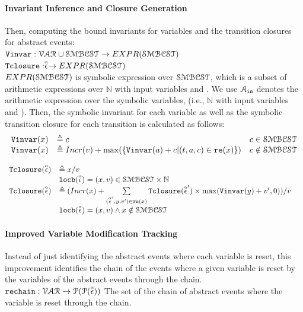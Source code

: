 \paragraph*{Invariant Inference and Closure Generation }
Then, computing the bound invariants for variables and the transition closures for abstract events:
\\ 
$ {\mathtt{Vinvar}}: \mathcal{VAR} \cup \mathcal{SMBCST} \to EXPR(\mathcal{SMBCST})$
\\
${\mathtt{Tclosure}}: \stackrel{\scriptscriptstyle{\alpha}}{\mathtt{\epsilon}{}} \to EXPR(\mathcal{SMBCST})$
\\
$EXPR(\mathcal{SMBCST})$ is symbolic expression 
over $\mathcal{SMBCST}$, which is a subset of arithmetic expressions over $\mathbb{N}$ with input variables and $ $.
We use $\mathcal{A}_{\mathtt{in}}$ denotes the arithmetic expression 
over the symbolic variables, (i.e., $\mathbb{N}$ with input variables and $ $).
Then, the symbolic invariant for each variable 
as well as the symbolic transition closure for each transition is calculated as follows:
\[ 
\begin{array}{lll}
  {\ensuremath{\mathtt{Vinvar}}}(x) & \triangleq c & c \in \mathcal{SMBCST} \\
  {\mathtt{Vinvar}}(x) & \triangleq Incr(v) + \max(\{{\mathtt{Vinvar}}(a) + c | (t, a, c) \in \mathtt{re}(x)\}) & c \notin \mathcal{SMBCST}
\end{array}
\]
%
\begin{defn}
  \label{def:transition_closure_base}
\[ 
\begin{array}{lll}
  {\ensuremath{\mathtt{Tclosure}}}(\stackrel{\scriptscriptstyle{\alpha}}{\mathtt{\epsilon}{}}) 
  & \triangleq x / v & \\ 
  & \mathtt{locb}(\stackrel{\scriptscriptstyle{\alpha}}{\mathtt{\epsilon}{}}) = (x, v) \in \mathcal{SMBCST} \times \mathbb{N} & \\
  {\mathtt{Tclosure}}(\stackrel{\scriptscriptstyle{\alpha}}{\mathtt{\epsilon}{}}) 
  & \triangleq (Incr(x) + 
  \sum\limits_{(\stackrel{\scriptscriptstyle{\alpha}}{\mathtt{\epsilon}{}}', y, v') \in \mathtt{re}(x)}
  {\mathtt{Tclosure}}(\stackrel{\scriptscriptstyle{\alpha}}{\mathtt{\epsilon}{}}') \times \max({\mathtt{Vinvar}}(y) + v', 0) ) / v & \\
  & \mathtt{locb}(\stackrel{\scriptscriptstyle{\alpha}}{\mathtt{\epsilon}{}}) = (x, v) \land x \notin \mathcal{SMBCST} & 
\end{array}
  \]
\end{defn}
%
\paragraph*{Improved Variable Modification Tracking}
Instead of just identifying the abstract events where each variable is reset,
this improvement identifies the chain of the events where a given variable is reset by the 
variables of the abstract events through the chain.
\\
$\mathtt{rechain}: \mathcal{VAR} \to \mathcal{P}(\mathcal{P}(\stackrel{\scriptscriptstyle{\alpha}}{\mathtt{\epsilon}{}})) $
The set of the chain of abstract events where the variable is reset through the chain.
%
